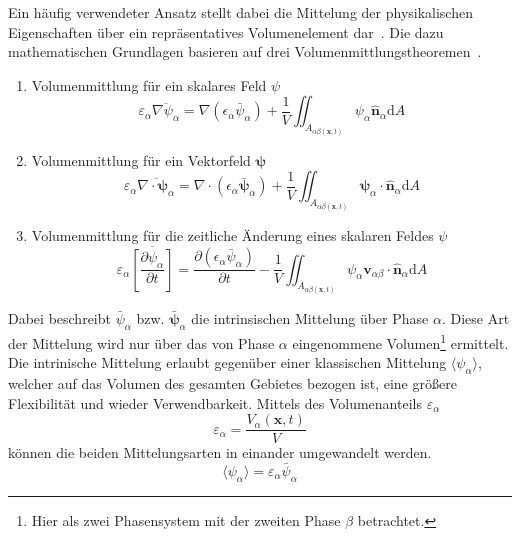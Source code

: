 Ein häufig verwendeter Ansatz stellt dabei die Mittelung der physikalischen Eigenschaften über ein repräsentatives Volumenelement dar~\cite{Burow2016,Arunachalam2019,Li2020}. Die dazu mathematischen Grundlagen basieren auf drei Volumenmittlungstheoremen~\cite{Gray1977}.
\begin{enumerate}
    \item Volumenmittlung für ein skalares Feld $\psi$ 
    \begin{equation}
        \varepsilon_{\alpha} \overline{\nabla \psi_{\alpha}} = \nabla \left(\epsilon_{\alpha} \bar{\psi}_{\alpha} \right) + \frac{1}{V} \iint_{A_{\alpha \beta(\boldsymbol{x},t)}}\psi_{\alpha} \hat{\boldsymbol{n}}_{\alpha} \text{d}A
    \end{equation}
    \item Volumenmittlung für ein Vektorfeld $\boldsymbol{\psi}$
    \begin{equation}
        \varepsilon_{\alpha} \overline{\nabla \cdot \boldsymbol{\psi}_{\alpha}} = \nabla \cdot \left(\epsilon_{\alpha} \bar{\boldsymbol{\psi}}_{\alpha} \right) + \frac{1}{V} \iint_{A_{\alpha \beta(\boldsymbol{x},t)}}\boldsymbol{\psi}_{\alpha} \cdot \hat{\boldsymbol{n}}_{\alpha} \text{d}A
    \end{equation}
    \item Volumenmittlung für die zeitliche Änderung eines skalaren Feldes $\psi$ 
    \begin{equation}
        \varepsilon_{\alpha} \overline{\left[\frac{\partial \psi_{\alpha}}{\partial t}\right]} = \frac{\partial \left(\epsilon_{\alpha} \bar{\psi}_{\alpha} \right)}{\partial t} - \frac{1}{V} \iint_{A_{\alpha \beta(\boldsymbol{x},t)}}\psi_{\alpha} \boldsymbol{v}_{\alpha \beta} \cdot \hat{\boldsymbol{n}}_{\alpha} \text{d}A
    \end{equation}
\end{enumerate}
Dabei beschreibt $\bar{\psi}_{\alpha}$ bzw. $\bar{\boldsymbol{\psi}}_{\alpha}$ die intrinsischen Mittelung über Phase $\alpha$. Diese Art der Mittelung wird nur über das von Phase $\alpha$ eingenommene Volumen\footnote{Hier als zwei Phasensystem mit der zweiten Phase $\beta$ betrachtet.} ermittelt. Die intrinische Mittelung erlaubt gegenüber einer klassischen Mittelung $\langle \psi_{\alpha} \rangle$, welcher auf das Volumen des gesamten Gebietes bezogen ist, eine größere Flexibilität und wieder Verwendbarkeit. Mittels des Volumenanteils $\varepsilon_{\alpha}$
\begin{equation}
    \varepsilon_{\alpha} = \frac{V_{\alpha}(\boldsymbol{x},t)}{V} 
\end{equation}
können die beiden Mittelungsarten in einander umgewandelt werden.
\begin{equation}
    \langle \psi_{\alpha} \rangle = \varepsilon_{\alpha} \bar{\psi}_{\alpha}
\end{equation}

